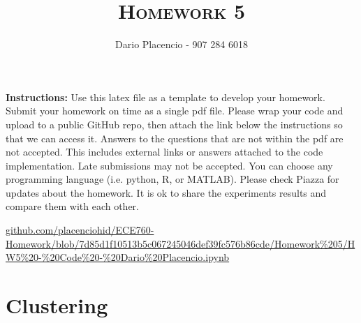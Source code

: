\documentclass[a4paper]{article}
\title{\textsc{Homework 5}} %
\author{Dario Placencio - 907 284 6018}
\date{}
\theoremstyle{definition}
\newenvironment{soln}{
    \leavevmode\color{blue}\ignorespaces
}{}
\begin{document}
\maketitle 

\textbf{Instructions:}
Use this latex file as a template to develop your homework. Submit your homework on time as a single pdf file. Please wrap your code and upload to a public GitHub repo, then attach the link below the instructions so that we can access it. Answers to the questions that are not within the pdf are not accepted. This includes external links or answers attached to the code implementation. Late submissions may not be accepted. You can choose any programming language (i.e. python, R, or MATLAB). Please check Piazza for updates about the homework. It is ok to share the experiments results and compare them with each other.

\vspace{0.1in}

\begin{soln}
    \url{github.com/placenciohid/ECE760-Homework/blob/7d85d1f10513b5c067245046def39fc576b86cde/Homework%205/HW5%20-%20Code%20-%20Dario%20Placencio.ipynb} 
\end{soln}

\section{Clustering}
\end{document}

